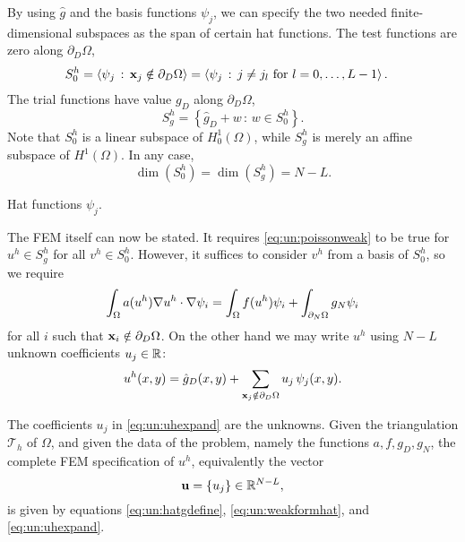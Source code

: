 By using $\hat g$ and the basis functions $\psi_j$, we can specify the two needed finite-dimensional subspaces as the span of certain hat functions.  The test functions are zero along $\partial_D \Omega$,
\begin{align*}
S_{0}^h &= \left<\psi_j \,:\, \mathbf{x}_j \notin \partial_D \Omega\right> = \left<\psi_j \,:\, j \neq j_l \text{ for } l=0,\dots,L-1\right>.
\end{align*}
The trial functions have value $g_D$ along $\partial_D \Omega$,
\begin{equation}
S_{g}^h = \left\{\hat g_D + w \,:\, w \in S_{0}^h\right\}.
\end{equation}
Note that $S_{0}^h$ is a linear subspace of $H_{0}^1(\Omega)$, while $S_{g}^h$ is merely an affine subspace of $H^1(\Omega)$.  In any case,
\begin{equation}
\dim(S_{0}^h)=\dim(S_{g}^h)=N-L.
\end{equation}

\begin{marginfigure}

\caption{Hat functions $\psi_j$.}
\label{fig:un:hatfunction}
\end{marginfigure}

The FEM itself can now be stated.  It requires \eqref{eq:un:poissonweak} to be true for $u^h\in S_{g}^h$ for all $v^h\in S_{0}^h$.  However, it suffices to consider $v^h$ from a basis of $S_{0}^h$, so we require
\begin{equation}
\int_\Omega a(u^h) \nabla u^h \cdot \nabla \psi_i = \int_\Omega f(u^h) \psi_i + \int_{\partial_N\Omega} g_N \psi_i \label{eq:un:weakformhat}
\end{equation}
for all $i$ such that $\mathbf{x}_i \notin \partial_D \Omega$.  On the other hand we may write $u^h$ using $N-L$ unknown coefficients $u_j\in\mathbb{R}$:
\begin{equation}
u^h(x,y) = \hat g_D(x,y) + \sum_{\mathbf{x}_j \notin \partial_D \Omega} u_j\, \psi_j(x,y). \label{eq:un:uhexpand}
\end{equation}

The coefficients $u_j$ in \eqref{eq:un:uhexpand} are the unknowns.  Given the triangulation $\mathcal{T}_h$ of $\Omega$, and given the data of the problem, namely the functions $a,f,g_D,g_N$, the complete FEM specification of $u^h$, equivalently the vector
\begin{equation}
\mathbf{u} = \{u_j\} \in \mathbb{R}^{N-L},  \label{eq:un:unknowns}
\end{equation}
is given by equations \eqref{eq:un:hatgdefine}, \eqref{eq:un:weakformhat}, and \eqref{eq:un:uhexpand}.

